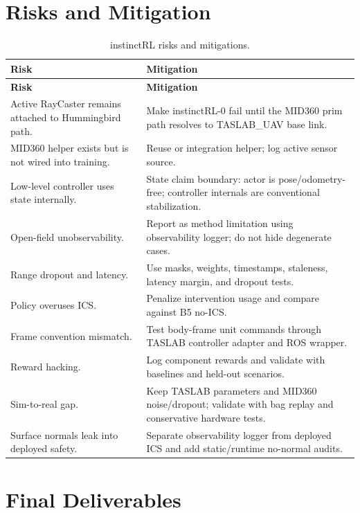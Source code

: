 \documentclass[11pt]{article}
\newcommand{\code}[1]{\texttt{\detokenize{#1}}}
\begin{document}
\section{Risks and Mitigation}

\begin{longtable}{@{}L{0.30\textwidth}L{0.58\textwidth}@{}}
\caption{instinctRL risks and mitigations.}\\
\toprule
\textbf{Risk} & \textbf{Mitigation} \\
\midrule
\endfirsthead
\toprule
\textbf{Risk} & \textbf{Mitigation} \\
\midrule
\endhead
Active RayCaster remains attached to Hummingbird path. & Make instinctRL-0 fail until the MID360 prim path resolves to TASLAB\_UAV base link. \\
MID360 helper exists but is not wired into training. & Reuse \code{create\_livox\_from\_hydra\_cfg} or integration helper; log active sensor source. \\
Low-level controller uses state internally. & State claim boundary: actor is pose/odometry-free; controller internals are conventional stabilization. \\
Open-field unobservability. & Report as method limitation using observability logger; do not hide degenerate cases. \\
Range dropout and latency. & Use masks, weights, timestamps, staleness, latency margin, and dropout tests. \\
Policy overuses ICS. & Penalize intervention usage and compare against B5 no-ICS. \\
Frame convention mismatch. & Test body-frame unit commands through TASLAB controller adapter and ROS wrapper. \\
Reward hacking. & Log component rewards and validate with baselines and held-out scenarios. \\
Sim-to-real gap. & Keep TASLAB parameters and MID360 noise/dropout; validate with bag replay and conservative hardware tests. \\
Surface normals leak into deployed safety. & Separate observability logger from deployed ICS and add static/runtime no-normal audits. \\
\bottomrule
\end{longtable}

\section{Final Deliverables}
\end{document}
